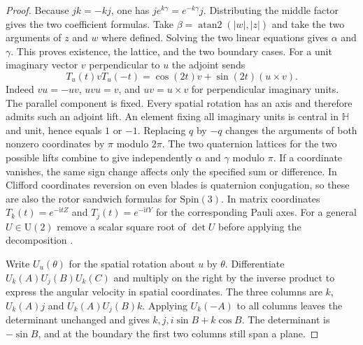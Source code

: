 \documentclass[11pt,reqno]{amsart}
\theoremstyle{definition}
\theoremstyle{remark}
\numberwithin{equation}{section}
\newcommand{\HH}{\mathbb{H}}
\begin{document}
\begin{proof}
Because $jk=-kj$, one has $j e^{k\gamma}=e^{-k\gamma}j$.
Distributing the middle factor gives the two coefficient formulas.
Take $\beta=\operatorname{atan2}(|w|,|z|)$ and take the two
arguments of $z$ and $w$ where defined. Solving the two linear
equations gives $\alpha$ and $\gamma$. This proves existence,
the lattice, and the two boundary cases. For a unit imaginary
vector $v$ perpendicular to $u$ the adjoint sends
\[
 T_u(t)vT_u(-t)=\cos(2t)v+\sin(2t)(u\times v).
\]
Indeed $vu=-uv$, $uvu=v$, and $uv=u\times v$ for perpendicular
imaginary units. The parallel component is fixed. Every spatial
rotation has an axis and therefore admits such an adjoint lift.
An element fixing all imaginary units is central in $\HH$ and
unit, hence equals $1$ or $-1$. Replacing $q$ by $-q$ changes the arguments
of both nonzero coordinates by $\pi$ modulo $2\pi$. The two quaternion
lattices for the two possible lifts combine to give independently
$\alpha$ and $\gamma$ modulo $\pi$. If a coordinate vanishes, the same
sign change affects only the specified sum or difference. In Clifford
coordinates reversion
on even blades is quaternion conjugation, so these are also the
rotor sandwich formulas for $\mathrm{Spin}(3)$. In matrix coordinates
$T_k(t)=e^{-\mathrm i t Z}$ and $T_j(t)=e^{-\mathrm i tY}$ for the
corresponding Pauli axes. For a general $U\in\mathrm U(2)$ remove a
scalar square root of $\det U$ before applying the decomposition
\cite[Theorem~4.1]{m7:NC}\cite[Lemma~4.1]{m7:Barenco}.

Write $U_u(\theta)$ for the spatial rotation about $u$ by $\theta$.
Differentiate $U_k(A)U_j(B)U_k(C)$ and multiply on the right
by the inverse product to express the angular velocity in spatial
coordinates. The three columns are $k$, $U_k(A)j$ and
$U_k(A)U_j(B)k$. Applying $U_k(-A)$ to all columns leaves the
determinant unchanged and gives $k,j,i\sin B+k\cos B$. The
determinant is $-\sin B$, and at the boundary the first two
columns still span a plane.
\end{proof}
\end{document}
